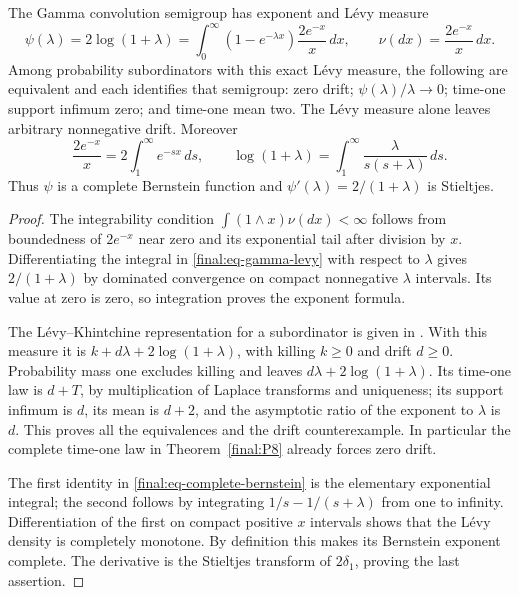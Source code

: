 \begin{proposition}
\label{final:P8-levy}
The Gamma convolution semigroup has exponent and L\'evy measure
\begin{equation}
 \psi(\lambda)=2\log(1+\lambda)
 =\int_0^\infty(1-e^{-\lambda x})\frac{2e^{-x}}x\,dx,
 \qquad \nu(dx)=\frac{2e^{-x}}x\,dx.
 \label{final:eq-gamma-levy}
\end{equation}
Among probability subordinators with this exact L\'evy measure, the
following are equivalent and each identifies that semigroup:
zero drift; $\psi(\lambda)/\lambda\to0$; time-one support infimum
zero; and time-one mean two.  The L\'evy measure alone leaves arbitrary
nonnegative drift.  Moreover
\begin{equation}
 \frac{2e^{-x}}x=2\int_1^\infty e^{-sx}\,ds,
 \qquad
 \log(1+\lambda)=\int_1^\infty
                 \frac{\lambda}{s(s+\lambda)}\,ds.
 \label{final:eq-complete-bernstein}
\end{equation}
Thus $\psi$ is a complete Bernstein function and
$\psi'(\lambda)=2/(1+\lambda)$ is Stieltjes.
\end{proposition}
\begin{proof}
The integrability condition
$\int(1\wedge x)\nu(dx)<\infty$ follows from boundedness of
$2e^{-x}$ near zero and its exponential tail after division by $x$.
Differentiating the integral in \eqref{final:eq-gamma-levy} with
respect to $\lambda$ gives $2/(1+\lambda)$ by dominated convergence
on compact nonnegative $\lambda$ intervals.  Its value at zero is
zero, so integration proves the exponent formula.

 The L\'evy--Khintchine representation for a subordinator is given in
 \cite[Theorem~3.2, p.~22]{SSV}.  With this measure it is
 $k+d\lambda+2\log(1+\lambda)$, with killing $k\geq0$
and drift $d\geq0$.  Probability mass one excludes killing and
leaves $d\lambda+2\log(1+\lambda)$.  Its time-one law is
$d+T$, by multiplication of Laplace transforms and uniqueness;
its support infimum is $d$, its mean is $d+2$, and the asymptotic
ratio of the exponent to $\lambda$ is $d$.  This proves all the
equivalences and the drift counterexample.  In particular the
complete time-one law in Theorem~\ref{final:P8} already forces
zero drift.

The first identity in \eqref{final:eq-complete-bernstein} is the
elementary exponential integral; the second follows by integrating
$1/s-1/(s+\lambda)$ from one to infinity.  Differentiation of the
first on compact positive $x$ intervals shows that the L\'evy density
is completely monotone.  By definition this makes its Bernstein
exponent complete.  The derivative is the Stieltjes transform of
$2\delta_1$, proving the last assertion.
\end{proof}


